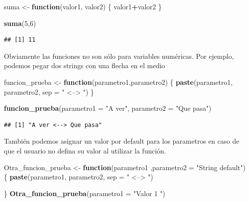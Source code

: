 \documentclass[]{book}
\newenvironment{Shaded}{\begin{snugshade}}{\end{snugshade}}
\newcommand{\ControlFlowTok}[1]{\textcolor[rgb]{0.13,0.29,0.53}{\textbf{#1}}}
\newcommand{\DataTypeTok}[1]{\textcolor[rgb]{0.13,0.29,0.53}{#1}}
\newcommand{\DecValTok}[1]{\textcolor[rgb]{0.00,0.00,0.81}{#1}}
\newcommand{\KeywordTok}[1]{\textcolor[rgb]{0.13,0.29,0.53}{\textbf{#1}}}
\newcommand{\NormalTok}[1]{#1}
\newcommand{\OperatorTok}[1]{\textcolor[rgb]{0.81,0.36,0.00}{\textbf{#1}}}
\newcommand{\StringTok}[1]{\textcolor[rgb]{0.31,0.60,0.02}{#1}}
\begin{document}
\begin{Shaded}
\begin{Highlighting}[]
\NormalTok{suma <-}\StringTok{ }\ControlFlowTok{function}\NormalTok{(valor1, valor2) \{}
\NormalTok{  valor1}\OperatorTok{+}\NormalTok{valor2}
\NormalTok{\}}

\KeywordTok{suma}\NormalTok{(}\DecValTok{5}\NormalTok{,}\DecValTok{6}\NormalTok{)}
\end{Highlighting}
\end{Shaded}

\begin{verbatim}
## [1] 11
\end{verbatim}

Obviamente las funciones no son sólo para variables numéricas. Por ejemplo, podemos pegar dos strings con una flecha en el medio

\begin{Shaded}
\begin{Highlighting}[]
\NormalTok{funcion_prueba <-}\StringTok{ }\ControlFlowTok{function}\NormalTok{(parametro1,parametro2) \{}
  \KeywordTok{paste}\NormalTok{(parametro1, parametro2, }\DataTypeTok{sep =} \StringTok{" <--> "}\NormalTok{)}
\NormalTok{\}}

\KeywordTok{funcion_prueba}\NormalTok{(}\DataTypeTok{parametro1 =} \StringTok{"A ver"}\NormalTok{, }\DataTypeTok{parametro2 =} \StringTok{"Que pasa"}\NormalTok{)}
\end{Highlighting}
\end{Shaded}

\begin{verbatim}
## [1] "A ver <--> Que pasa"
\end{verbatim}

También podemos asignar un valor por default para los parametros en caso de que el usuario no defina su valor al utilizar la función.

\begin{Shaded}
\begin{Highlighting}[]
\NormalTok{Otra_funcion_prueba <-}\StringTok{ }\ControlFlowTok{function}\NormalTok{(parametro1 ,}\DataTypeTok{parametro2 =} \StringTok{"String default"}\NormalTok{) \{}
  \KeywordTok{paste}\NormalTok{(parametro1, parametro2, }\DataTypeTok{sep =} \StringTok{" <--> "}\NormalTok{)}
  
\NormalTok{\}}
\KeywordTok{Otra_funcion_prueba}\NormalTok{(}\DataTypeTok{parametro1 =} \StringTok{"Valor 1 "}\NormalTok{)}
\end{Highlighting}
\end{Shaded}
\end{document}

